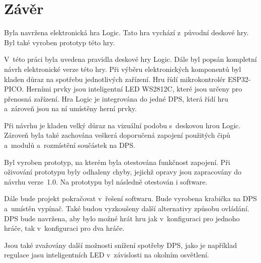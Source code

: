 \chapter*{Závěr}
{}

Byla navržena elektronická hra Logic. Tato hra vychází z~původní deskové hry. Byl také vyroben prototyp této hry.

V~této práci byla uvedena pravidla deskové hry Logic. Dále byl popsán kompletní návrh elektronické verze této hry. Při výběru elektronických 
komponentů byl kladen důraz na spotřebu jednotlivých zařízení. Hru řídí mikrokontrolér ESP32-PICO. Herními prvky jsou inteligentní LED WS2812C, 
které jsou určeny pro přenosná zařízení. Hra Logic je integrována do jedné DPS, která řídí hru a~zároveň jsou na ní umístěny herní prvky.

Při návrhu je kladen velký důraz na vizuální podobu s~deskovou hrou Logic. Zároveň byla také zachována veškerá doporučená zapojení použitých 
čipů a~modulů a~rozmístění součástek na DPS.

Byl vyroben prototyp, na kterém byla otestována funkčnost zapojení. Při oživování prototypu byly odhaleny chyby, jejichž opravy jsou zapracovány 
do návrhu verze~1.0. Na prototypu byl následně otestován i software.

Dále bude projekt pokračovat v~řešení softwaru. Bude vyrobena krabička na DPS a~umístěn vypínač. Také budou vyzkoušeny další
alternativy způsobu ovládání. DPS bude navržena, aby bylo možné hrát hru jak v~konfiguraci pro jednoho hráče, tak v~konfiguraci
pro dva hráče.

Jsou také zvažovány další možnosti snížení spotřeby DPS, jako je například regulace jasu inteligentních LED v~závislosti na 
okolním osvětlení.
